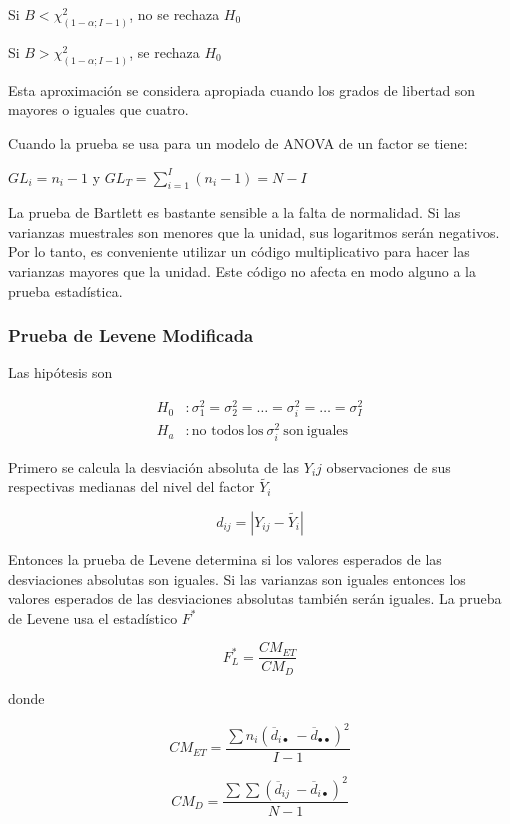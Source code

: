 \documentclass[]{book}
\theoremstyle{definition}
\theoremstyle{definition}
\theoremstyle{definition}
\theoremstyle{remark}
\begin{document}
Si \(B < \chi_{(1 - \alpha;I - 1)}^{2}\), no se rechaza \(H_{0}\)

Si \(B > \chi_{(1 - \alpha;I - 1)}^{2}\), se rechaza \(H_{0}\)

Esta aproximación se considera apropiada cuando los grados de libertad
son mayores o iguales que cuatro.

Cuando la prueba se usa para un modelo de ANOVA de un factor se tiene:

\(GL_{i} = n_{i} - 1\) y
\(GL_{T} = \sum_{i = 1}^{I}\left( n_{i} - 1 \right) = N - I\)

La prueba de Bartlett es bastante sensible a la falta de normalidad. Si
las varianzas muestrales son menores que la unidad, sus logaritmos serán
negativos. Por lo tanto, es conveniente utilizar un código
multiplicativo para hacer las varianzas mayores que la unidad. Este
código no afecta en modo alguno a la prueba estadística.

\hypertarget{prueba-de-levene-modificada}{%
\subsubsection{Prueba de Levene
Modificada}\label{prueba-de-levene-modificada}}

Las hipótesis son

\[
\begin{aligned}
H_{0} &:\sigma_{1}^{2} = \sigma_{2}^{2} = \ldots = \sigma_{i}^{2} = \ldots = \sigma_{I}^{2}\\
H_{a} &:\text{no todos}\ \text{los}\ \sigma_{i}^{2}\ \text{son}\ \text{iguales}
\end{aligned}
\]

Primero se calcula la desviación absoluta de las \(Y_ij\) observaciones
de sus respectivas medianas del nivel del factor \(\tilde{Y_{i}}\)

\[
d_{ij} = \left| Y_{ij} - \tilde{Y_{i}} \right|
\]

Entonces la prueba de Levene determina si los valores esperados de las
desviaciones absolutas son iguales. Si las varianzas son iguales
entonces los valores esperados de las desviaciones absolutas también
serán iguales. La prueba de Levene usa el estadístico \(F^{*}\)

\[
F_{L}^{*} = \frac{CM_{ET}}{CM_D}
\]

donde

\[
CM_{ET} = \frac{\sum n_{i}\left( \overline{d}_{i\bullet}\  - \overline{d}_{\bullet\bullet} \right)^{2}}{I - 1}
\]

\[
CM_D = \frac{\sum\sum\left( \overline{d}_{ij}\  - \overline{d}_{i\bullet}\right)^{2}}{N - 1}
\]
\end{document}

